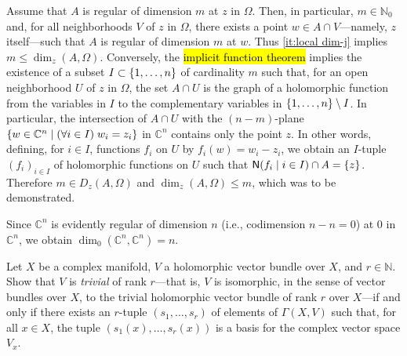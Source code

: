 \documentclass[a4paper]{amsart}
\newcommand{\N}{\mathbb{N}}
\newcommand{\C}{\mathbb{C}}
\newcommand{\Zero}[1]{\mathsf{N}(#1)}
\theoremstyle{remark}
\numberwithin{equation}{question}
\DeclarePairedDelimiter\set{\{}{\}}
\begin{document}
\begin{solution}
\begin{solenum}
\item Assume that $A$ is regular of dimension $m$ at $z$ in $\Omega$. Then, in particular, $m \in \N_0$ and, for all neighborhoods $V$ of $z$ in $\Omega$, there exists a point $w \in A \cap V$---namely, $z$ itself---such that $A$ is regular of dimension $m$ at $w$. Thus \cref{it:local dim-j} implies $m \le \dim_z(A,\Omega)$. Conversely, the \hl{implicit function theorem} implies the existence of a subset $I \subset \set{1,\dots,n}$ of cardinality $m$ such that, for an open neighborhood $U$ of $z$ in $\Omega$, the set $A \cap U$ is the graph of a holomorphic function from the variables in $I$ to the  complementary variables in $\set{1,\dots,n} \setminus I$. In particular, the intersection of $A \cap U$ with the $(n-m)$-plane $\set{w \in \C^n \mid (\forall i \in I) \; w_i = z_i}$ in $\C^n$ contains only the point $z$. In other words, defining, for $i \in I$, functions $f_i$ on $U$ by $f_i(w) = w_i - z_i$, we obtain an $I$-tuple $(f_i)_{i \in I}$ of holomorphic functions on $U$ such that $\Zero{f_i \mid i \in I} \cap A = \set z$. Therefore $m \in D_z(A,\Omega)$ and $\dim_z(A,\Omega) \le m$, which was to be demonstrated.

Since $\C^n$ is evidently regular of dimension $n$ (i.e., codimension $n-n = 0$) at $0$ in $\C^n$, we obtain $\dim_0(\C^n,\C^n) = n$.
\end{solenum}
\end{solution}

\begin{question}[subtitle=Trivial vector bundles and global frames]
\label{qu:trivial bundle}
Let $X$ be a complex manifold, $V$ a holomorphic vector bundle over $X$, and $r \in \N$. Show that $V$ is \emph{trivial} of rank $r$---that is, $V$ is isomorphic, in the sense of vector bundles over $X$, to the trivial holomorphic vector bundle of rank $r$ over $X$---if and only if there exists an $r$-tuple $(s_1,\dots,s_r)$ of elements of $\Gamma(X,V)$ such that, for all $x \in X$, the tuple $(s_1(x),\dots,s_r(x))$ is a basis for the complex vector space $V_x$.
\end{question}
\end{document}
